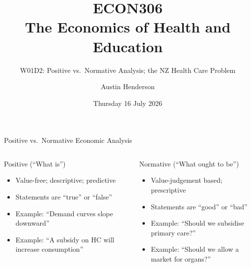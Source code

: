 \documentclass[aspectratio=169, 12pt]{beamer}
\title[ECON306: W01D2 — Positive, Normative \& the NZ Problem]{ECON306\\The Economics of Health and Education}
\subtitle{W01D2: Positive vs.\ Normative Analysis; the NZ Health Care Problem}
\author{Austin Henderson}
\institute{Department of Economics\\University of Otago}
\date{Thursday 16 July 2026}
\begin{document}
\begin{frame}[plain]
  \titlepage
\end{frame}



\begin{frame}{Positive vs.\ Normative Economic Analysis}
  \begin{columns}
      \begin{block}{Positive (``What is'')}
        \begin{itemize}
          \item Value-free; descriptive; predictive
          \item Statements are ``true'' or ``false''
          \item Example: ``Demand curves slope downward''
          \item Example: ``A subsidy on HC will increase consumption''
        \end{itemize}
      \end{block}
      \begin{alertblock}{Normative (``What ought to be'')}
        \begin{itemize}
          \item Value-judgement based; prescriptive
          \item Statements are ``good'' or ``bad''
          \item Example: ``Should we subsidise primary care?''
          \item Example: ``Should we allow a market for organs?''
        \end{itemize}
      \end{alertblock}
  \end{columns}
\end{frame}
\end{document}
